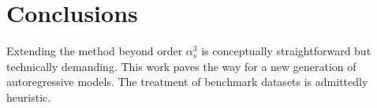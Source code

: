 \section{Conclusions}\label{sec:conclusions}

Extending the method beyond order $\alpha_s^3$ is conceptually
straightforward but technically demanding. This work paves the way for a
new generation of autoregressive models. The treatment of benchmark
datasets is admittedly heuristic.


